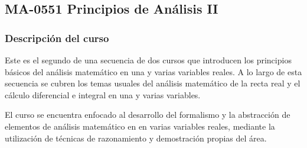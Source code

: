\newpage
\subsection*{MA-0551 Principios de Análisis II}

\hypertarget{MA0551}{}
\begin{refsection}
\begin{table}[H]
\end{table}



\subsubsection*{Descripción del curso}



Este es el segundo de una secuencia de dos cursos que introducen los principios básicos del análisis matemático en una y varias variables reales. A lo largo de esta secuencia se cubren los temas usuales del análisis matemático
de la recta real y el cálculo diferencial e integral en una y varias variables. 

El curso se encuentra enfocado al desarrollo del formalismo y la abstracción de elementos de análisis matemático en en varias variables reales, mediante la utilización de técnicas de razonamiento y demostración propias del área.


\end{refsection}
